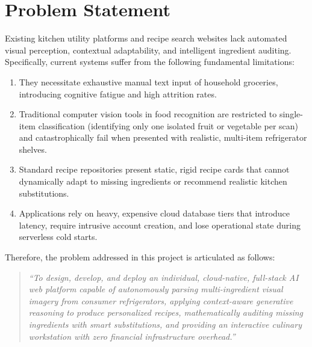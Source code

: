 \section{Problem Statement}
Existing kitchen utility platforms and recipe search websites lack automated visual perception, contextual adaptability, and intelligent ingredient auditing. Specifically, current systems suffer from the following fundamental limitations:
\begin{enumerate}
    \item They necessitate exhaustive manual text input of household groceries, introducing cognitive fatigue and high attrition rates.
    \item Traditional computer vision tools in food recognition are restricted to single-item classification (identifying only one isolated fruit or vegetable per scan) and catastrophically fail when presented with realistic, multi-item refrigerator shelves.
    \item Standard recipe repositories present static, rigid recipe cards that cannot dynamically adapt to missing ingredients or recommend realistic kitchen substitutions.
    \item Applications rely on heavy, expensive cloud database tiers that introduce latency, require intrusive account creation, and lose operational state during serverless cold starts.
\end{enumerate}

Therefore, the problem addressed in this project is articulated as follows:
\begin{quote}
\textit{“To design, develop, and deploy an individual, cloud-native, full-stack AI web platform capable of autonomously parsing multi-ingredient visual imagery from consumer refrigerators, applying context-aware generative reasoning to produce personalized recipes, mathematically auditing missing ingredients with smart substitutions, and providing an interactive culinary workstation with zero financial infrastructure overhead.”}
\end{quote}

